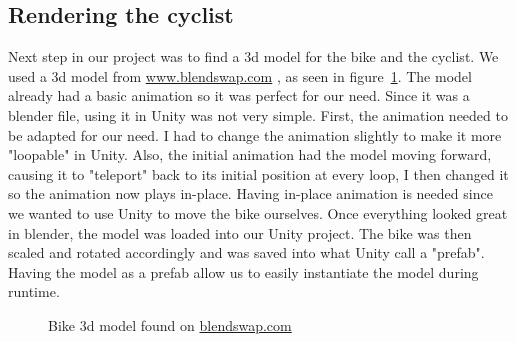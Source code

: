 \documentclass{scrartcl}
\begin{document}
    \subsection{Rendering the cyclist} 
		Next step in our project was to find a 3d model for the bike and the cyclist. We
		used a 3d model from \url{www.blendswap.com} \citep{Bicycle:Blender}, as seen in
		figure~\ref{fig:bike_model}. The model already had a basic animation so it was
		perfect for our need. Since it was a blender file, using it in Unity was not
		very simple. First, the animation needed to be adapted for our need. I had to
		change the animation slightly to make it more "loopable" in Unity. Also, the
		initial animation had the model moving forward, causing it to "teleport" back to
		its initial position at every loop, I then changed it so the animation now plays
		in-place. Having in-place animation is needed since we wanted to use Unity to
		move the bike ourselves. Once everything looked great in blender, the model was
		loaded into our Unity project. The bike was then scaled and rotated accordingly
		and was saved into what Unity call a "prefab". Having the model as a prefab
		allow us to easily instantiate the model during runtime.

        \begin{figure}[h]
        \caption{Bike 3d model found on \url{blendswap.com}} \label{fig:bike_model}
        \end{figure}
		
\end{document}
